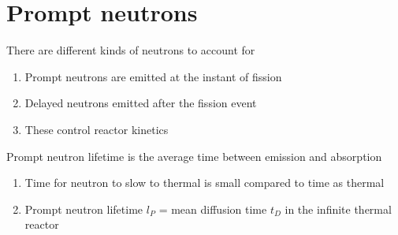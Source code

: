 \documentclass[aspectratio=1610,pdftex,dvipsnames,compress,xcolor={dvipsnames}]{beamer}
\begin{document}
\section{Prompt neutrons}


\addtocounter{framenumber}{-1} 
\begin{frame}{There are different kinds of neutrons to account for}
    \begin{enumerate}[series=outerlist,topsep=0pt,itemsep=21pt,leftmargin=*,label=(\arabic*)]
        \item[]Prompt neutrons are emitted at the instant of fission
        \item[]Delayed neutrons emitted after the fission event
        \item[]These control reactor kinetics
    \end{enumerate}
\end{frame}


\begin{frame}{Prompt neutron lifetime is the average time between emission and absorption}
    \begin{enumerate}[series=outerlist,topsep=0pt,itemsep=21pt,leftmargin=*,label=(\arabic*)]
        \item[]Time for neutron to slow to thermal is small compared to time as thermal
        \item[]Prompt neutron lifetime $l_P$ = mean diffusion time $t_D$ in the infinite thermal reactor
    \end{enumerate}
\end{frame}
\end{document}
